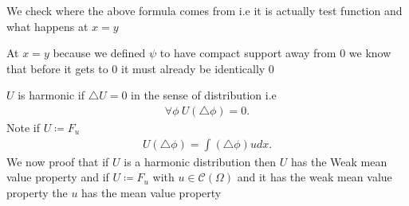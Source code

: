 We check where the above formula comes from i.e it is actually test function and what happens at $x=y$
\begin{remark}
 At $x=y$  because we defined $\psi$ to have compact support away from 0 we know that before it gets to 0 it must already be identically 0
\end{remark}
$U$ is harmonic if $\triangle U = 0$ in the sense of distribution i.e 
\begin{align*}
  \forall \phi  \ U(\triangle \phi ) = 0
.\end{align*}
Note if $U \coloneqq F_u$
\begin{align*}
  U(\triangle \phi ) = \int (\triangle \phi)u dx
.\end{align*}
We now proof that if $U$ is a harmonic distribution then $U$ has the Weak mean value property  and 
if $U \coloneqq  F_u$ with $u \in  \mathcal{C}(\Omega )$ and it has the weak mean value property the $u$ has the mean value property
